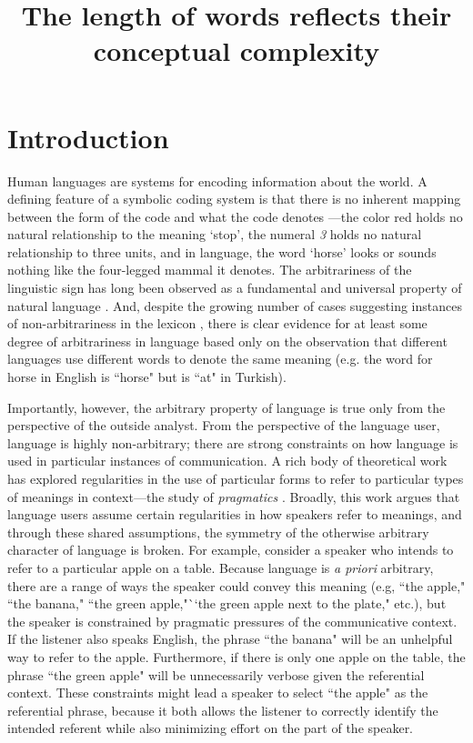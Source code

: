 \documentclass[man]{apa2}
\title{The length of words reflects their conceptual complexity}
\begin{document}
\maketitle                            


\section{Introduction}

Human languages are systems for encoding information about the world. A defining feature of a symbolic coding system is that there is no inherent mapping between the form of the code and what the code denotes  \cite{peirce}---the color red holds no natural relationship to the meaning `stop', the numeral {\it 3} holds no natural relationship to three units, and in language, the word `horse' looks or sounds nothing like the four-legged mammal it denotes.  The arbitrariness of the linguistic sign has long been observed as a fundamental and universal property of natural language \cite{saussure, hockett1960}. And, despite the growing number of cases suggesting instances of non-arbitrariness in the lexicon \cite[for a review]{schmidtke2014phonological}, there is clear evidence for at least some degree of arbitrariness in language based only on the observation that different languages use different words to denote the same meaning  (e.g. the word for horse in English is ``horse" but is ``at" in Turkish). 


Importantly, however, the arbitrary property of language is true only from the perspective of the outside analyst. From the perspective of the language user, language is highly non-arbitrary; there are strong constraints on how language is used in particular instances of communication.  A rich body of theoretical work has explored regularities in the use of  particular forms to refer to particular  types of meanings in context---the study of {\it pragmatics} \cite{grice1975logic,horn1984, clark1996using}. Broadly, this work argues that  language users assume certain regularities in how speakers refer to meanings, and through these shared assumptions, the symmetry of the otherwise arbitrary character of language is broken. For example, consider a speaker who intends to refer to a particular apple on a table. Because language is {\it a priori} arbitrary, there are a range of  ways the speaker could convey this meaning (e.g, ``the apple," ``the banana," ``the green apple,"``the green apple next to the plate," etc.), but the speaker is constrained by pragmatic pressures of the communicative context. If the listener also speaks English, the phrase ``the banana" will be an  unhelpful way to refer to the apple. Furthermore, if there is only one apple on the table, the phrase ``the green apple" will be unnecessarily verbose given the referential context. These constraints might lead a speaker to select ``the apple" as the referential phrase, because it both allows the listener to correctly identify the intended referent while also minimizing effort on the part of the speaker. 
\end{document}
